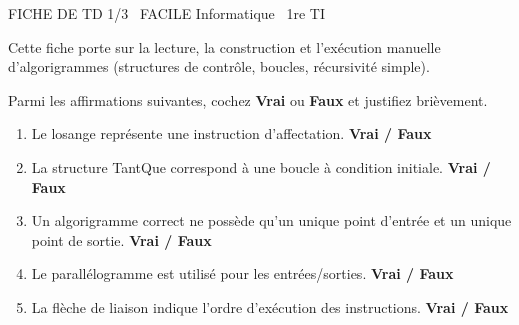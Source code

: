 \documentclass[11pt]{article}
\begin{document}
\begin{tcolorbox}[enhanced,colback=popink,colframe=popink,arc=10pt,boxrule=0pt,left=12pt,right=12pt,top=9pt,bottom=9pt]
{\color{white}\popxbold\small FICHE DE TD 1/3 \textbullet\ FACILE \hfill Informatique \textbullet\ 1re TI\par}
\end{tcolorbox}
\vspace{4pt}
\noindent Cette fiche porte sur la lecture, la construction et l'exécution manuelle d'algorigrammes (structures de contrôle, boucles, récursivité simple).

\begin{exercice}
Parmi les affirmations suivantes, cochez \textbf{Vrai} ou \textbf{Faux} et justifiez brièvement.
\begin{enumerate}
    \item Le losange représente une instruction d'affectation. \hfill \textbf{Vrai / Faux}
    \item La structure \og TantQue \fg{} correspond à une boucle à condition initiale. \hfill \textbf{Vrai / Faux}
    \item Un algorigramme correct ne possède qu'un unique point d'entrée et un unique point de sortie. \hfill \textbf{Vrai / Faux}
    \item Le parallélogramme est utilisé pour les entrées/sorties. \hfill \textbf{Vrai / Faux}
    \item La flèche de liaison indique l'ordre d'exécution des instructions. \hfill \textbf{Vrai / Faux}
\end{enumerate}
\end{exercice}
\end{document}
